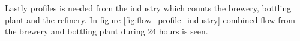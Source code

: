 



Lastly profiles is needed from the industry which counts the brewery, bottling plant and the refinery. In figure \ref{fig:flow_profile_industry} combined flow from the brewery and bottling plant during 24 hours is seen.

